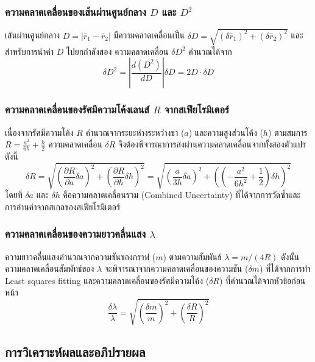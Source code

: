 \documentclass[11pt,a4paper]{article}
\begin{document}
\subsubsection{ความคลาดเคลื่อนของเส้นผ่านศูนย์กลาง $D$ และ $D^2$}

เส้นผ่านศูนย์กลาง $D = |\bar{r}_1 - \bar{r}_2|$ มีความคลาดเคลื่อนเป็น $\delta D = \sqrt{(\delta \bar{r}_1)^2 + (\delta \bar{r}_2)^2}$ และสำหรับการนำค่า $D$ ไปยกกำลังสอง ความคลาดเคลื่อน $\delta D^2$ คำนวณได้จาก
\[
\delta D^2 = \left| \frac{d(D^2)}{dD} \right| \delta D = 2D \cdot \delta D
\]

\subsubsection{ความคลาดเคลื่อนของรัศมีความโค้งเลนส์ $R$ จากสเฟียโรมิเตอร์}



เนื่องจากรัศมีความโค้ง $R$ คำนวณจากระยะห่างระหว่างขา ($a$) และความสูงส่วนโค้ง ($h$) ตามสมการ $R = \frac{a^2}{6h} + \frac{h}{2}$ ความคลาดเคลื่อน $\delta R$ จึงต้องพิจารณาการส่งผ่านความคลาดเคลื่อนจากทั้งสองตัวแปรดังนี้
\[
\delta R = \sqrt{ \left( \frac{\partial R}{\partial a} \delta a \right)^2 + \left( \frac{\partial R}{\partial h} \delta h \right)^2 } = \sqrt{ \left( \frac{a}{3h} \delta a \right)^2 + \left( \left( -\frac{a^2}{6h^2} + \frac{1}{2} \right) \delta h \right)^2 }
\]
โดยที่ $\delta a$ และ $\delta h$ คือความคลาดเคลื่อนรวม (Combined Uncertainty) ที่ได้จากการวัดซ้ำและการอ่านค่าจากสเกลของสเฟียโรมิเตอร์

\subsubsection{ความคลาดเคลื่อนของความยาวคลื่นแสง $\lambda$}

ความยาวคลื่นแสงคำนวณจากความชันของกราฟ ($m$) ตามความสัมพันธ์ $\lambda = m / (4R)$ ดังนั้นความคลาดเคลื่อนสัมพัทธ์ของ $\lambda$ จะพิจารณาจากความคลาดเคลื่อนของความชัน ($\delta m$) ที่ได้จากการทำ Least squares fitting \cite{Taylor} และความคลาดเคลื่อนของรัศมีความโค้ง ($\delta R$) ที่คำนวณได้จากหัวข้อก่อนหน้า
\[
\frac{\delta \lambda}{\lambda} = \sqrt{ \left( \frac{\delta m}{m} \right)^2 + \left( \frac{\delta R}{R} \right)^2 }
\]






\subsection{การวิเคราะห์ผลและอภิปรายผล} \label{analysis}
\end{document}
